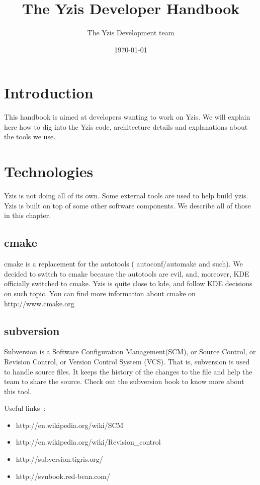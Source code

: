 \documentclass[a4paper,12pt]{report}
\title{The Yzis Developer Handbook}
\date{\today}
\author{The Yzis Development team}
\begin{document}
\maketitle
\tableofcontents

% 


\chapter{Introduction}

This handbook is aimed at developers wanting to work on Yzis. We will
explain here how to dig into the Yzis code, architecture details and
explanations about the tools we use.


\chapter{Technologies}
Yzis is not doing all of its own. Some external tools are used to help
build yzis. Yzis is built on top of some other software components. We describe
all of those in this chapter.

\section{cmake}
cmake is a replacement for the autotools ( autoconf/automake and such). We
decided to switch to cmake because the autotools are evil, and, moreover,
KDE officially switched to cmake. Yzis is quite close to kde, and follow
KDE decisions on such topic.
You can find more information about cmake on http://www.cmake.org

\section{subversion}
Subversion is a Software Configuration Management(SCM), or Source Control,
or Revision Control, or Version Control System (VCS). That is, subversion
is used to handle source files. It keeps the history of the changes to the
file and help the team to share the source.
Check out the subversion book to know more about this tool.

Useful links~:
\begin{itemize}
\item http://en.wikipedia.org/wiki/SCM
\item http://en.wikipedia.org/wiki/Revision\_control
\item http://subversion.tigris.org/
\item http://svnbook.red-bean.com/
\end{itemize}
\end{document}
